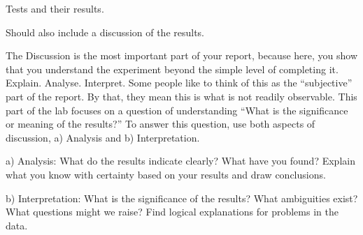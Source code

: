 Tests and their results.

Should also include a discussion of the results.

The Discussion is the most important part of 
your report, because here, you show that you 
understand the experiment beyond the simple level 
of completing it.
Explain. Analyse. Interpret.
Some people like to think of this as the 
``subjective'' part of the report. 
By that, they mean this is what is not readily observable.
This part of the lab focuses on a question of understanding 
``What is the significance or meaning of the 
results?''
To answer this question, use both aspects 
of discussion, 
a) Analysis and
b) Interpretation.

a) Analysis: What do the results indicate clearly?
What have you found?
Explain what you know with certainty based on your results and draw conclusions.

b) Interpretation: What is the significance of the 
results?
What ambiguities exist?
What questions might we raise?
Find logical explanations for problems in the data.